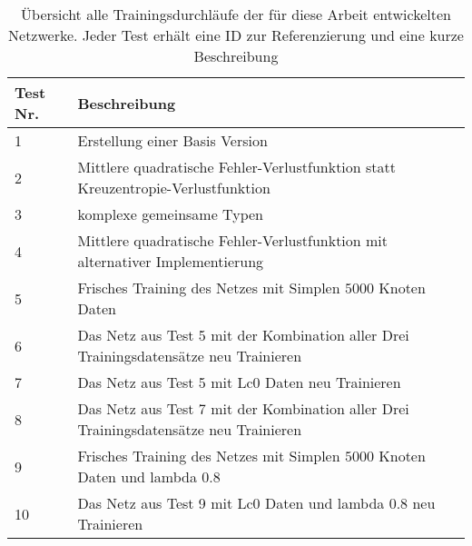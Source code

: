 \begin{table}[h]
  \caption{Übersicht alle Trainingsdurchläufe der für diese Arbeit entwickelten Netzwerke. Jeder Test erhält eine ID zur Referenzierung und eine kurze Beschreibung}
  \label{table:testOverview}
  \renewcommand{\arraystretch}{1.2}
  \centering
  \sffamily
  \begin{footnotesize}
    \begin{tabular}{l l}
      \toprule
      \textbf{Test Nr.} & \textbf{Beschreibung}                                                                 \\
      \midrule
      1                 & Erstellung einer Basis Version                                                        \\
      2                 & Mittlere quadratische Fehler-Verlustfunktion statt Kreuzentropie-Verlustfunktion      \\
      3                 & komplexe gemeinsame Typen                                                             \\
      4                 & Mittlere quadratische Fehler-Verlustfunktion mit alternativer Implementierung         \\
      5                 & Frisches Training des Netzes mit Simplen $5000$ Knoten Daten                          \\
      6                 & Das Netz aus Test 5 mit der Kombination aller Drei Trainingsdatensätze neu Trainieren \\
      7                 & Das Netz aus Test 5 mit \ac{Lc0} Daten neu Trainieren                                 \\
      8                 & Das Netz aus Test 7 mit der Kombination aller Drei Trainingsdatensätze neu Trainieren \\
      9                 & Frisches Training des Netzes mit Simplen $5000$ Knoten Daten und lambda 0.8           \\
      10                & Das Netz aus Test 9 mit \ac{Lc0} Daten und lambda 0.8 neu Trainieren                  \\
      \bottomrule
    \end{tabular}
  \end{footnotesize}
  \rmfamily
\end{table}

